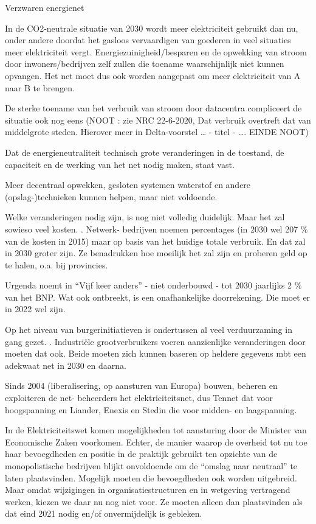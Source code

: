 \begin{voorstel}{Verzwaren energienet}
\begin{overwegingen}
In de CO2-neutrale situatie van 2030 wordt meer elektriciteit gebruikt dan nu, onder andere doordat het gasloos vervaardigen van goederen in veel situaties meer elektriciteit vergt.
Energiezuinigheid/besparen en de opwekking van stroom door inwoners/bedrijven zelf zullen die toename waarschijnlijk niet kunnen opvangen. Het net moet dus ook worden aangepast om meer elektriciteit van A naar B te brengen.

De sterke toename van het verbruik van stroom door datacentra compliceert de situatie ook nog eens (NOOT : zie NRC 22-6-2020, Dat verbruik overtreft dat van middelgrote steden. Hierover meer in Delta-voorstel … - titel - …. EINDE NOOT)

Dat de energieneutraliteit technisch grote veranderingen in de toestand, de capaciteit en de werking van het net nodig maken, staat vast.

Meer decentraal opwekken, gesloten systemen waterstof en andere (opslag-)technieken kunnen helpen, maar niet voldoende.

Welke veranderingen nodig zijn, is nog niet volledig duidelijk. Maar het zal sowieso veel kosten. . Netwerk- bedrijven noemen percentages (in 2030 wel 207 \% van de kosten in 2015) maar op basis van het huidige totale verbruik. En dat zal in 2030 groter zijn. Ze benadrukken hoe moeilijk het zal zijn en proberen geld op te halen, o.a. bij provincies.

Urgenda noemt in “Vijf keer anders” - niet onderbouwd - tot 2030 jaarlijks 2 \% van het BNP. Wat ook ontbreekt, is een onafhankelijke doorrekening. Die moet er in 2022 wel zijn.

Op het niveau van burgerinitiatieven is ondertussen al veel verduurzaming in gang gezet. . Industriële grootverbruikers voeren aanzienlijke veranderingen door moeten dat ook. Beide moeten zich kunnen baseren op heldere gegevens mbt een adekwaat net in 2030 en daarna.

Sinds 2004 (liberalisering, op aansturen van Europa) bouwen, beheren en exploiteren de net- beheerders het elektriciteitsnet, dus Tennet dat voor hoogspanning en Liander, Enexis en Stedin die voor midden- en laagspanning.

In de Elektriciteitswet komen mogelijkheden tot aansturing door de Minister van Economische Zaken voorkomen. Echter, de manier waarop de overheid tot nu toe haar bevoegdheden en positie in de praktijk gebruikt ten opzichte van de monopolistische bedrijven blijkt onvoldoende om de “omslag naar neutraal” te laten plaatsvinden. Mogelijk moeten die bevoegdheden ook worden uitgebreid. Maar omdat wijzigingen in organisatiestructuren en in wetgeving vertragend werken, kiezen we daar nu nog niet voor. Ze moeten alleen dan plaatsvinden als dat eind 2021 nodig en/of onvermijdelijk is gebleken. 


\end{overwegingen}
\end{voorstel}
